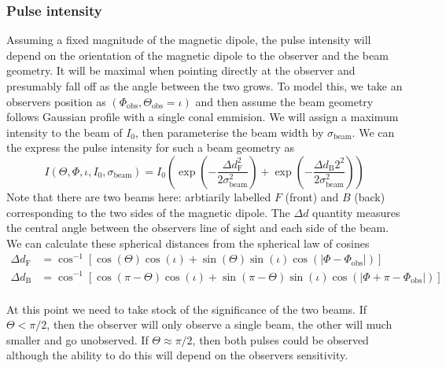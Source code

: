 \documentclass[/home/greg/Thesis/main/main.tex]{subfiles}
\begin{document}
\graphicspath{{/home/greg/Neutron_star_modelling/BeamwidthCalculation/img/}}

\newcommand{\ThetaO}{\Theta_{\mathrm{obs}}}
\newcommand{\PhiO}{\Phi_{\mathrm{obs}}}
\newcommand{\sigmaB}{\sigma_{\textrm{beam}}}
\newcommand{\Imax}{I_{\textrm{max}}}
\newcommand{\ThetaT}{\tilde{\Theta}}

\subsubsection{Pulse intensity}

Assuming a fixed magnitude of the magnetic dipole, the pulse intensity will
depend on the orientation of the magnetic dipole to the observer and the beam
geometry. It will be maximal when pointing directly at the observer and
presumably fall off as the angle between the two grows. To model this, we take
an observers position as $(\PhiO, \ThetaO=\iota)$ and then assume the beam geometry
follows Gaussian profile with a single conal emmision. We will assign a maximum
intensity to the beam of $I_0$, then parameterise the beam width by $\sigmaB$.
We can the express the pulse intensity for such a beam geometry as
\begin{equation}
I
(\Theta, \Phi, \iota,  I_{0}, \sigmaB) 
=
I_{0} \left(
\exp\left(-\frac{\Delta d_{\mathrm{F}}^{2}}{2\sigmaB^{2}}\right)+
\exp\left(-\frac{\Delta d_{\mathrm{B}}2^{2}}{2\sigmaB^{2}}\right)
\right)
\label{eqn: beam intensity}
\end{equation}
Note that there are two beams here: arbtiarily labelled $F$ (front) and $B$ (back)
corresponding to the two sides of the magnetic dipole. The $\Delta d$ quantity
measures the central angle between the observers line of sight and each side
of the beam.
We can calculate these spherical distances from the spherical law of cosines
\begin{align}
\Delta d_\mathrm{F} &= \cos^{-1}\left[\cos(\Theta)\cos(\iota) +
                              \sin(\Theta)\sin(\iota)\cos(|\Phi - \PhiO|)\right] \\
\Delta d_\mathrm{B} &= \cos^{-1}\left[\cos(\pi - \Theta)\cos(\iota) +
                              \sin(\pi - \Theta)\sin(\iota)\cos(|\Phi + \pi - \PhiO|)\right] \\
\label{eqn: angular sep}
\end{align}

At this point we need to take stock of the significance of the two beams. If
$\Theta < \pi/2$, then the observer will only observe a single beam, the other
will much smaller and go unobserved. If $\Theta \approx \pi/2$, then both pulses
could be observed although the ability to do this will depend on the observers
sensitivity. 
\end{document}
